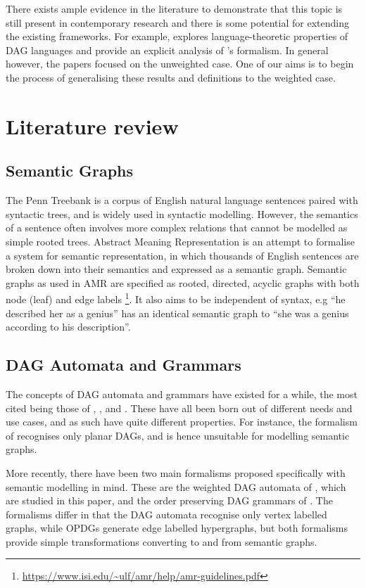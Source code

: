 \documentclass[11pt]{article}
\begin{document}
There exists ample evidence in the literature to demonstrate that this topic is
still present in contemporary research and there is some potential for extending
the existing frameworks. For example, \citeauthor{blum2019properties} explores
language-theoretic properties of DAG languages and provide an explicit analysis
of \citeauthor{chiang2018weighted}'s formalism. In general however, the papers
focused on the unweighted
case. One of our aims is to begin the process of generalising these results and
definitions to the weighted
case.

\section{Literature review}

\subsection{Semantic Graphs}
The Penn Treebank is a corpus of English natural language sentences paired with
syntactic trees, and is widely used in syntactic modelling. However, the
semantics of a sentence often involves more complex relations that cannot be
modelled as simple rooted trees. Abstract Meaning Representation
\cite{banarescu2013abstract} is an attempt to formalise a system for semantic
representation, in which thousands of English sentences are broken down into
their semantics and expressed as a semantic graph. Semantic graphs as used in
AMR are specified as rooted, directed, acyclic graphs
with both node (leaf) and edge labels
\footnote{\url{https://www.isi.edu/~ulf/amr/help/amr-guidelines.pdf}}. It also
aims to be independent of syntax, e.g ``he described her as a genius'' has an
identical semantic graph to ``she was a genius according to his description''. 

\subsection{DAG Automata and Grammars}
The concepts of DAG automata and grammars have existed for a while, the most
cited being those of \citet{kamimura1981parallel}, \citet{quernheim2012dagger},
and \citet{priese2007finite}. These have all been born out of different needs
and use cases, and as such have quite different properties. For instance, the
formalism of \cite{kamimura1981parallel} recognises only planar DAGs, and is
hence unsuitable for modelling semantic graphs. 

More recently, there have been two main formalisms proposed specifically with
semantic modelling in mind. These are the weighted DAG automata of
\cite{chiang2018weighted}, which are studied in this paper, and the order
preserving DAG grammars of \cite{ericson2019order}. The formalisms differ in
that the DAG automata recognise only vertex labelled
graphs, while OPDGs generate edge labelled hypergraphs, but both
formalisms provide simple transformations converting to and from semantic
graphs. 
\end{document}
